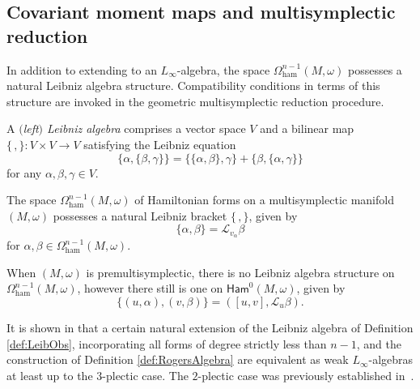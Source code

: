 \documentclass[10pt,a4paper]{amsart}
\numberwithin{equation}{section}
\newcommand{\Ham}{\mathsf{Ham}}
\newcommand{\ham}{\text{ham}}
\renewcommand{\L}{\mathscr{L}}
\begin{document}
\subsection{Covariant moment maps and multisymplectic reduction}\label{Ssec:MultiRed}

In addition to extending to an $L_\infty$-algebra, the space $\Omega^{n-1}_{\ham}(M,\omega)$ possesses a natural Leibniz algebra structure. Compatibility conditions in terms of this structure are invoked in the geometric multisymplectic reduction procedure.

\begin{Definition}
	A \emph{$($left$)$ Leibniz algebra} comprises a vector space $V$ and a bilinear map $\{\,,\}\colon V\times V\to V$ satisfying the Leibniz equation
	\[
		\{\alpha,\{\beta,\gamma\}\} = \{\{\alpha,\beta\},\gamma\} + \{\beta,\{\alpha,\gamma\}\}
	\]
	for any $\alpha,\beta,\gamma \in V$.
\end{Definition}

\begin{Definition}\label{def:LeibObs}
	The space $\Omega_\ham^{n-1}(M,\omega)$ of Hamiltonian forms on a multisymplectic manifold $(M,\omega)$ possesses a natural Leibniz bracket $\{\,,\}$, given by
	\[
		\{\alpha,\beta\} = \L_{v_\alpha}\beta
	\]
	for $\alpha,\beta\in\Omega_\ham^{n-1}(M,\omega)$.
\end{Definition}

When $(M,\omega)$ is premultisymplectic, there is no Leibniz algebra structure on $\Omega_\ham^{n-1}(M,\omega)$, however there still is one on $\Ham^0(M,\omega)$, given by
\[
	\{(u,\alpha),(v,\beta)\}=([u,v], \L_u\beta).
\]

\begin{Remark}
	It is shown in \cite[Proposition~5.2]{Dehling17} that a certain natural extension of the Leibniz algebra of Definition \ref{def:LeibObs}, incorporating all forms of degree strictly less than $n-1$, and the construction of Definition \ref{def:RogersAlgebra} are equivalent as weak $L_\infty$-algebras at least up to the $3$-plectic case. The $2$-plectic case was previously established in~\cite{BaezHoffnungRogers10}.
\end{Remark}
\end{document}
